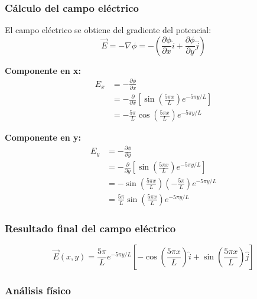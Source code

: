\documentclass[a4paper]{article}
\begin{document}
\subsubsection{Cálculo del campo eléctrico}

El campo eléctrico se obtiene del gradiente del potencial:
\begin{equation}
\vec{E} = -\nabla \phi = -\left(\frac{\partial \phi}{\partial x} \hat{i} + \frac{\partial \phi}{\partial y} \hat{j}\right)
\end{equation}

\textbf{Componente en x:}
\begin{align}
E_x &= -\frac{\partial \phi}{\partial x} \\
&= -\frac{\partial}{\partial x}\left[\sin\left(\frac{5\pi x}{L}\right) e^{-5\pi y/L}\right] \\
&= -\frac{5\pi}{L} \cos\left(\frac{5\pi x}{L}\right) e^{-5\pi y/L}
\end{align}

\textbf{Componente en y:}
\begin{align}
E_y &= -\frac{\partial \phi}{\partial y} \\
&= -\frac{\partial}{\partial y}\left[\sin\left(\frac{5\pi x}{L}\right) e^{-5\pi y/L}\right] \\
&= -\sin\left(\frac{5\pi x}{L}\right) \left(-\frac{5\pi}{L}\right) e^{-5\pi y/L} \\
&= \frac{5\pi}{L} \sin\left(\frac{5\pi x}{L}\right) e^{-5\pi y/L}
\end{align}

\subsubsection{Resultado final del campo eléctrico}

\begin{equation}
\boxed{\vec{E}(x, y) = \frac{5\pi}{L} e^{-5\pi y/L} \left[-\cos\left(\frac{5\pi x}{L}\right) \hat{i} + \sin\left(\frac{5\pi x}{L}\right) \hat{j}\right]}
\end{equation}

\subsubsection{Análisis físico}
\end{document}
